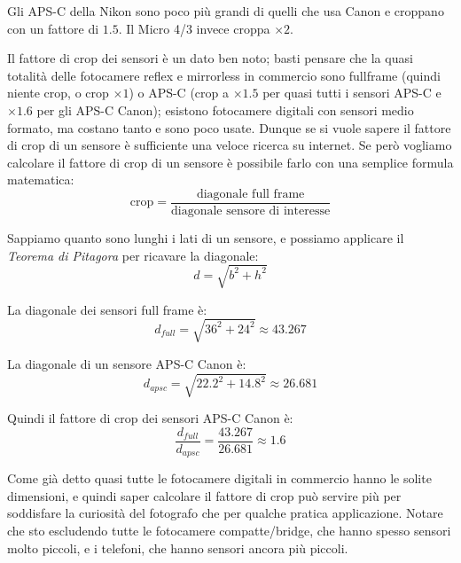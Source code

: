 Gli APS-C della Nikon sono poco più grandi di quelli che usa Canon e croppano con un fattore di $1.5$. Il Micro 4/3 invece croppa $\times 2$.

Il fattore di crop dei sensori è un dato ben noto; basti pensare che la quasi totalità delle fotocamere reflex e mirrorless in commercio sono fullframe (quindi niente crop, o crop $\times 1$) o APS-C (crop a $\times 1.5$ per quasi tutti i sensori APS-C e $\times 1.6$ per gli APS-C Canon); esistono fotocamere digitali con sensori medio formato, ma costano tanto e sono poco usate. Dunque se si vuole sapere il fattore di crop di un sensore è sufficiente una veloce ricerca su internet.
Se però vogliamo calcolare il fattore di crop di un sensore è possibile farlo con una semplice formula matematica:
\begin{equation}
    \text{crop} = \dfrac{\text{diagonale full frame}}{\text{diagonale sensore di interesse}}
    \label{eq:crop}
\end{equation}


Sappiamo quanto sono lunghi i lati di un sensore, e possiamo applicare il \textit{Teorema di Pitagora} per ricavare la diagonale:
\begin{equation}
    d = \sqrt{b^2 + h^2}
\end{equation}

La diagonale dei sensori full frame è:
\begin{equation}
    d_{full} = \sqrt{36^2 + 24^2} \approx 43.267
\end{equation}

La diagonale di un sensore APS-C Canon è:
\begin{equation}
    d_{apsc} = \sqrt{22.2^2 + 14.8^2} \approx 26.681
\end{equation}

Quindi il fattore di crop dei sensori APS-C Canon è:
\begin{equation}
    \dfrac{d_{full}}{d_{apsc}} = \dfrac{43.267}{26.681} \approx 1.6
\end{equation}

Come già detto quasi tutte le fotocamere digitali in commercio hanno le solite dimensioni, e quindi saper calcolare il fattore di crop può servire più per soddisfare la curiosità del fotografo che per qualche pratica applicazione. Notare che sto escludendo tutte le fotocamere compatte/bridge, che hanno spesso sensori molto piccoli, e i telefoni, che hanno sensori ancora più piccoli.

